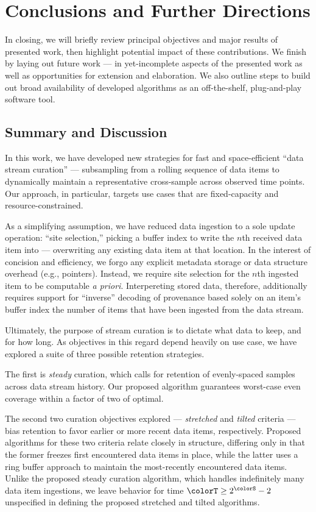 \section{Conclusions and Further Directions} \label{sec:conclusion}

In closing, we will briefly review principal objectives and major results of presented work, then highlight potential impact of these contributions.
We finish by laying out future work --- in yet-incomplete aspects of the presented work as well as opportunities for extension and elaboration.
We also outline steps to build out broad availability of developed algorithms as an off-the-shelf, plug-and-play software tool.

\subsection{Summary and Discussion}

In this work, we have developed new strategies for fast and space-efficient ``data stream curation'' --- subsampling from a rolling sequence of data items to dynamically maintain a representative cross-sample across observed time points.
Our approach, in particular, targets use cases that are fixed-capacity and resource-constrained.

As a simplifying assumption, we have reduced data ingestion to a sole update operation: ``site selection,'' picking a buffer index to write the $n$th received data item into --- overwriting any existing data item at that location.
In the interest of concision and efficiency, we forgo any explicit metadata storage or data structure overhead (e.g., pointers).
Instead, we require site selection for the $n$th ingested item to be computable \textit{a priori}.
Interpereting stored data, therefore, additionally requires support for ``inverse'' decoding of provenance based solely on an item's buffer index the number of items that have been ingested from the data stream.

Ultimately, the purpose of stream curation is to dictate what data to keep, and for how long.
As objectives in this regard depend heavily on use case, we have explored a suite of three possible retention strategies.

The first is \textit{steady} curation, which calls for retention of evenly-spaced samples across data stream history.
Our proposed algorithm guarantees worst-case even coverage within a factor of two of optimal.

The second two curation objectives explored --- \textit{stretched} and \textit{tilted} criteria --- bias retention to favor earlier or more recent data items, respectively.
Proposed algorithms for these two criteria relate closely in structure, differing only in that the former freezes first encountered data items in place, while the latter uses a ring buffer approach to maintain the most-recently encountered data items.
Unlike the proposed steady curation algorithm, which handles indefinitely many data item ingestions, we leave behavior for time $\colorT \geq 2^{\colorS} - 2$ unspecified in defining the proposed stretched and tilted algorithms.

